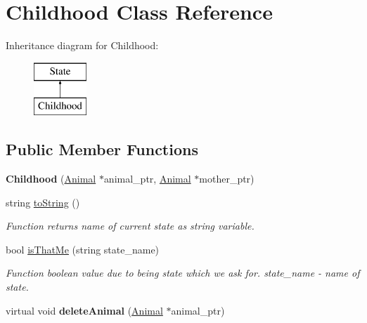 \hypertarget{class_childhood}{}\section{Childhood Class Reference}
\label{class_childhood}
Inheritance diagram for Childhood\+:\begin{figure}[H]
\begin{center}
\leavevmode
\includegraphics[height=2.000000cm]{class_childhood}
\end{center}
\end{figure}
\subsection*{Public Member Functions}
\begin{DoxyCompactItemize}
\item 
\hypertarget{class_childhood_aaec37e08923bd9b4ee70fb91978f6872}{}{\bfseries Childhood} (\hyperlink{class_animal}{Animal} $\ast$animal\+\_\+ptr, \hyperlink{class_animal}{Animal} $\ast$mother\+\_\+ptr)\label{class_childhood_aaec37e08923bd9b4ee70fb91978f6872}

\item 
string \hyperlink{class_childhood_af7cb046d34104c1f8eabf20f2c35321e}{to\+String} ()
\begin{DoxyCompactList}\small\item\em Function returns name of current state as string variable. \end{DoxyCompactList}\item 
bool \hyperlink{class_childhood_ad94f07e6803c6bdbd6ee752e6eef9019}{is\+That\+Me} (string state\+\_\+name)
\begin{DoxyCompactList}\small\item\em Function boolean value due to being state which we ask for.  state\+\_\+name -\/ name of state. \end{DoxyCompactList}\item 
\hypertarget{class_childhood_a5a9852ffda98ed530df8b2276fb43d10}{}virtual void {\bfseries delete\+Animal} (\hyperlink{class_animal}{Animal} $\ast$animal\+\_\+ptr)\label{class_childhood_a5a9852ffda98ed530df8b2276fb43d10}

\end{DoxyCompactItemize}

